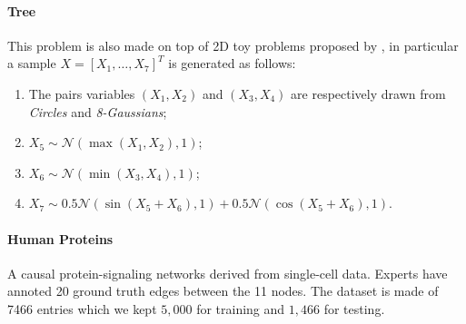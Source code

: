 \paragraph{Tree}
This problem is also made on top of 2D toy problems proposed by \cite{ffjord}, in particular a sample $X = [X_1,\hdots, X_7]^T$ is generated as follows:
\begin{enumerate}
    \item The pairs variables $(X_1, X_2)$ and $(X_3, X_4)$ are respectively drawn from \textit{Circles} and \textit{8-Gaussians};
    \item $X_5 \sim \mathcal{N}(\max(X_1, X_2), 1)$;
    \item $X_6 \sim \mathcal{N}(\min(X_3, X_4), 1)$;
    \item $X_7 \sim 0.5 \mathcal{N}(\sin(X_5 + X_6), 1) + 0.5 \mathcal{N}(\cos(X_5 + X_6), 1)$.
\end{enumerate}
\paragraph{Human Proteins}
A causal protein-signaling networks derived from single-cell data. Experts have annoted 20 ground truth edges between the 11 nodes. The dataset is made of 7466 entries which we kept $5,000$ for training and $1,466$ for testing.

